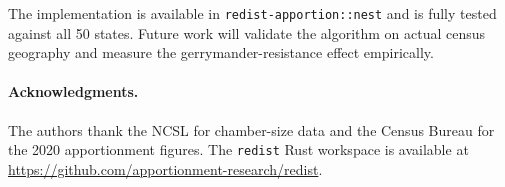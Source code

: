 The implementation is available in \texttt{redist-apportion::nest} and is fully
tested against all 50 states.  Future work will validate the algorithm on actual
census geography and measure the gerrymander-resistance effect empirically.

\paragraph{Acknowledgments.}
The authors thank the NCSL for chamber-size data and the Census Bureau for the
2020 apportionment figures.  The \texttt{redist} Rust workspace is available
at \url{https://github.com/apportionment-research/redist}.
